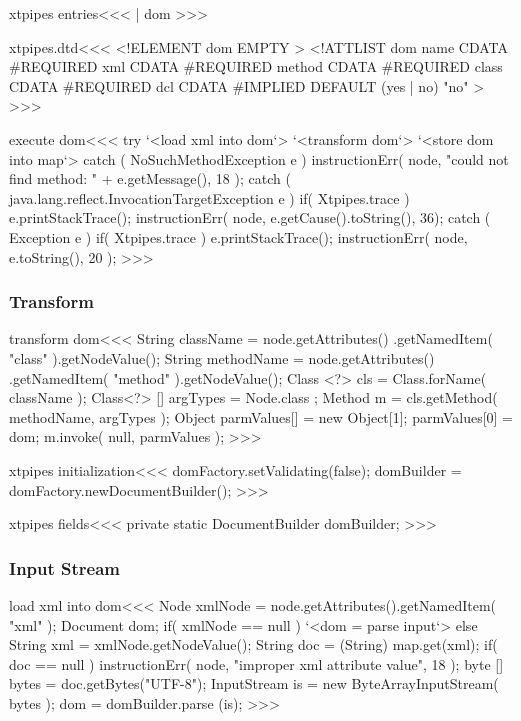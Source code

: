 \documentclass{article}
\begin{document}
{\<xtpipes entries\><<<
| dom
>>>


\<xtpipes.dtd\><<<
<!ELEMENT dom EMPTY >
<!ATTLIST dom
          name   CDATA #REQUIRED
          xml    CDATA #REQUIRED
          method CDATA #REQUIRED
          class  CDATA #REQUIRED
          dcl    CDATA #IMPLIED DEFAULT (yes | no) "no"
>
>>>



\<execute dom\><<<
try{
   `<load xml into dom`>
   `<transform dom`>
   `<store dom into map`>
} catch ( NoSuchMethodException e ){
   instructionErr( node,
       "could not find method: " + e.getMessage(), 18 );
} catch ( java.lang.reflect.InvocationTargetException e ){
   if( Xtpipes.trace ){ e.printStackTrace(); }
   instructionErr( node, e.getCause().toString(), 36);
} catch ( Exception e ){
   if( Xtpipes.trace ){ e.printStackTrace(); }
   instructionErr( node, e.toString(), 20 );
}
>>>



\subsubsection{Transform}


\<transform dom\><<<
String className = node.getAttributes()
             .getNamedItem( "class" ).getNodeValue();
String methodName = node.getAttributes()
             .getNamedItem( "method" ).getNodeValue();
Class <?> cls = Class.forName( className );
Class<?>  [] argTypes = { Node.class };
Method m = cls.getMethod( methodName, argTypes );
Object parmValues[] = new Object[1];
parmValues[0] = dom;
m.invoke( null, parmValues );
>>>

\<xtpipes initialization\><<<
domFactory.setValidating(false);
domBuilder = domFactory.newDocumentBuilder();
>>>

\<xtpipes fields\><<<
private static DocumentBuilder domBuilder;
>>>



\subsubsection{Input Stream}


\<load xml into dom\><<<
Node xmlNode = node.getAttributes().getNamedItem( "xml" );
Document dom;
if( xmlNode == null ){
   `<dom = parse input`>
} else {
   String xml = xmlNode.getNodeValue();
   String doc = (String) map.get(xml);
   if( doc == null ){
      instructionErr( node, "improper xml attribute value", 18 );
   }
   byte [] bytes = doc.getBytes("UTF-8");
   InputStream is = new ByteArrayInputStream( bytes );
   dom = domBuilder.parse (is);
}
>>>

}
\end{document}
